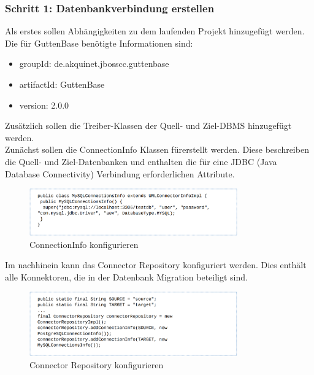 \subsubsection*{Schritt 1: Datenbankverbindung erstellen}
Als erstes sollen Abhängigkeiten zu dem laufenden Projekt hinzugefügt werden. Die für GuttenBase benötigte Informationen sind:
\begin{itemize}
	\item groupId: de.akquinet.jbosscc.guttenbase
	\item artifactId: GuttenBase
	\item version: 2.0.0
\end{itemize}
Zusätzlich sollen die Treiber-Klassen der Quell- und Ziel-DBMS hinzugefügt werden.\\
Zunächst sollen die ConnectionInfo Klassen fürerstellt werden. Diese beschreiben die Quell- und Ziel-Datenbanken und enthalten die für eine JDBC (Java Database Connectivity) Verbindung erforderlichen Attribute.\\
\begin{figure}[H]
	\centering
	\includegraphics[width=0.8\textwidth]{images/gb/conInfo}
	\caption{ConnectionInfo konfigurieren}
	\label{img:gb/conInfo}
\end{figure}

Im nachhinein kann das Connector Repository konfiguriert werden. Dies enthält alle Konnektoren, die in der Datenbank Migration beteiligt sind. \\
\begin{figure}[H]
	\centering
	\includegraphics[width=0.8\textwidth]{images/gb/repo}
	\caption{Connector Repository konfigurieren}
	\label{img:gb/repo}
\end{figure}


